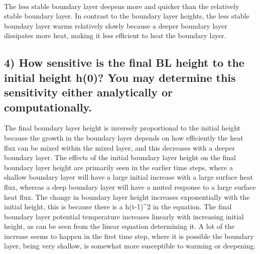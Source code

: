 \documentclass[11pt]{article}
\begin{document}
    \begin{center}
    \end{center}
    { \hspace*{\fill} \\}
    
    The less stable boundary layer deepens more and quicker than the
relatively stable boundary layer. In contrast to the boundary layer
heights, the less stable boundary layer warms relatively slowly because
a deeper boundary layer dissipates more heat, making it less efficient
to heat the boundary layer.

    \hypertarget{how-sensitive-is-the-final-bl-height-to-the-initial-height-h0-you-may-determine-this-sensitivity-either-analytically-or-computationally.}{%
\subsection{4) How sensitive is the final BL height to the initial
height h(0)? You may determine this sensitivity either analytically or
computationally.}\label{how-sensitive-is-the-final-bl-height-to-the-initial-height-h0-you-may-determine-this-sensitivity-either-analytically-or-computationally.}}

The final boundary layer height is inversely proportional to the initial
height because the growth in the boundary layer depends on how
efficiently the heat flux can be mixed within the mixed layer, and this
decreases with a deeper boundary layer. The effects of the initial
boundary layer height on the final boundary layer height are primarily
seen in the earlier time steps, where a shallow boundary layer will have
a large initial increase with a large surface heat flux, whereas a deep
boundary layer will have a muted response to a large surface heat flux.
The change in boundary layer height increases exponentially with the
initial height, this is because there is a h(t-1)\^{}2 in the equation.
The final boundary layer potential temperature increases linearly with
increasing initial height, as can be seen from the linear equation
determining it. A lot of the increase seems to happen in the first time
step, where it is possible the boundary layer, being very shallow, is
somewhat more susceptible to warming or deepening.
\end{document}
